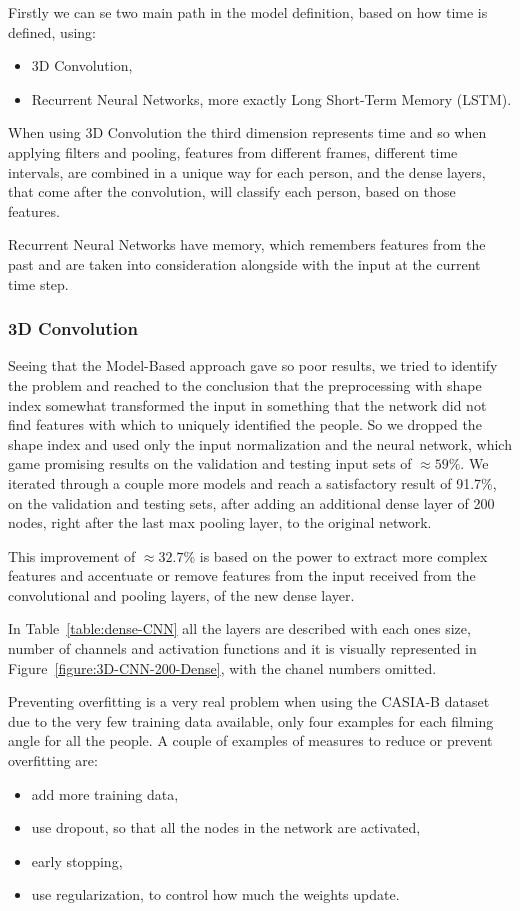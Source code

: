 \documentclass[12pt]{article}
\theoremstyle{definition}
\begin{document}
	Firstly we can se two main path in the model definition, based on how time is defined, using:
	\begin{itemize}
		\item 3D Convolution,
		\item Recurrent Neural Networks, more exactly Long Short-Term Memory (LSTM).
	\end{itemize}

	When using 3D Convolution the third dimension represents time and so when applying filters and pooling, features from different frames, different time intervals, are combined in a unique way for each person, and the dense layers, that come after the convolution, will classify each person, based on those features.

	Recurrent Neural Networks have memory, which remembers features from the past and are taken into consideration alongside with the input at the current time step.

	\subsubsection{3D Convolution}

	Seeing that the Model-Based approach gave so poor results, we tried to identify the problem and reached to the conclusion that the preprocessing with shape index somewhat transformed the input in something that the network did not find features with which to uniquely identified the people. So we dropped the shape index and used only the input normalization and the neural network, which game promising results on the validation and testing input sets of $\approx 59\%$. We iterated through a couple more models and reach a satisfactory result of 91.7\%, on the validation and testing sets, after adding an additional dense layer of 200 nodes, right after the last max pooling layer, to the original network.

	This improvement of $\approx 32.7\%$ is based on the power to extract more complex features and accentuate or remove features from the input received from the convolutional and pooling layers, of the new dense layer.

	In Table~\ref{table:dense-CNN} all the layers are described with each ones size, number of channels and activation functions and it is visually represented in Figure~\ref{figure:3D-CNN-200-Dense}, with the chanel numbers omitted.

	Preventing overfitting is a very real problem when using the CASIA-B dataset \cite{casia1}\cite{casia2}\cite{casia3} due to the very few training data available, only four examples for each filming angle for all the people. A couple of examples of measures to reduce or prevent overfitting are:
	\begin{itemize}
		\item add more training data,
		\item use dropout, so that all the nodes in the network are activated,
		\item early stopping,
		\item use regularization, to control how much the weights update.
	\end{itemize}
\end{document}
